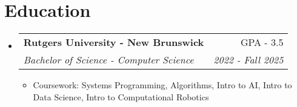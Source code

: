 \documentclass[letterpaper,10pt]{article}
\makeatletter
\newcommand{\resumeItem}[1]{
  \item\small{
    {#1 \vspace{-2pt}}
  }
}
\newcommand{\resumeSubheading}[4]{
  \vspace{-2pt}\item
    \begin{tabular*}{0.97\textwidth}[t]{l@{\extracolsep{\fill}}r}
      \textbf{#1} & #2 \\
      \textit{\small#3} & \textit{\small #4} \\
    \end{tabular*}\vspace{-7pt}
}
\newcommand{\resumeSubHeadingListStart}{\begin{itemize}[leftmargin=0.15in, label={}]}
\newcommand{\resumeSubHeadingListEnd}{\end{itemize}}
\newcommand{\resumeItemListStart}{\begin{itemize}}
\newcommand{\resumeItemListEnd}{\end{itemize}\vspace{-5pt}}
\makeatother
\begin{document}
\section{Education}
  \resumeSubHeadingListStart
    \resumeSubheading
      {Rutgers University - New Brunswick}{GPA - 3.5}
      {Bachelor of Science - Computer Science}{2022 - Fall 2025}
      \resumeItemListStart
        \resumeItem{Coursework: Systems Programming, Algorithms, Intro to AI, Intro to Data Science, Intro to Computational Robotics}
    \resumeItemListEnd
  \resumeSubHeadingListEnd
\end{document}
